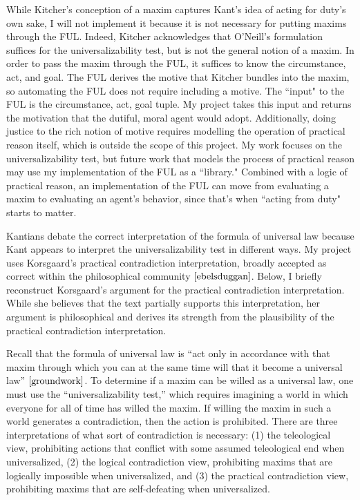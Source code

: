 \begin{isabellebody}
\begin{isamarkuptext}
While Kitcher's conception of a maxim captures Kant's idea of acting for duty's own sake, I will not implement it 
because it is not necessary for putting maxims through the FUL. Indeed, Kitcher acknowledges that 
O'Neill's formulation suffices for the universalizability test, but is not the general notion of a maxim.
In order to pass the maxim through the FUL, it suffices to know the circumstance, act, and goal. The FUL
derives the motive that Kitcher bundles into the maxim, so automating the FUL does not require 
including a motive. The ``input" to the FUL is the circumstance, act, goal tuple. My project takes 
this input and returns the motivation that the dutiful, moral agent would adopt. Additionally, doing
justice to the rich notion of motive requires modelling the operation of practical reason itself, 
which is outside the scope of this project. My work focuses on the universalizability test, but future work that 
models the process of practical reason may use my implementation of the FUL as a ``library." Combined 
with a logic of practical reason, an implementation of the FUL can move from evaluating a maxim to 
evaluating an agent's behavior, since that's when ``acting from duty" starts to matter.%
\end{isamarkuptext}\isamarkuptrue%
%
\isadelimdocument
%
\endisadelimdocument
%
\isatagdocument
%
\isamarkuptrue%
%
\endisatagdocument
{\isafolddocument}%
%
\isadelimdocument
%
\endisadelimdocument
%
\begin{isamarkuptext}%
Kantians debate the correct interpretation of the formula of universal law because Kant appears to 
interpret the universalizability test in different ways. My project uses Korsgaard's practical contradiction 
interpretation, broadly accepted as correct within the philosophical community $\cite[177]{ebelsduggan}$.
Below, I briefly reconstruct Korsgaard's argument for the practical contradiction interpretation. While 
she believes that the text partially supports this interpretation, her argument is philosophical and 
derives its strength from the plausibility of the practical contradiction interpretation.

Recall that the formula of universal law is “act only in accordance with that maxim through which you can at the 
same time will that it become a universal law” $\cite[4:421]{groundwork}$. To determine if a maxim can be willed as a 
universal law, one must use the “universalizability test,” which requires imagining a world in which 
everyone for all of time has willed the maxim. If willing the maxim in such a world generates a contradiction, 
then the action is prohibited. There are three interpretations of what sort of contradiction is necessary: 
(1) the teleological view, prohibiting actions that conflict with some assumed teleological end when 
universalized, (2) the logical contradiction view, prohibiting maxims that are logically impossible 
when universalized, and (3) the practical contradiction view, prohibiting maxims that are self-defeating 
when universalized.


\end{isamarkuptext}
\end{isabellebody}
